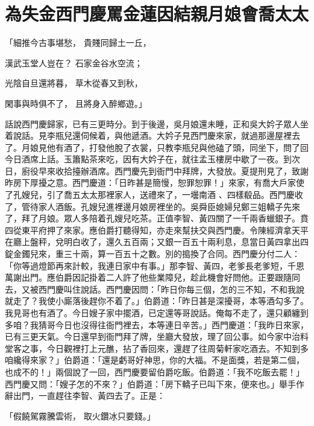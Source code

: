 %

\chapter{為失金西門慶罵金蓮\KG 因結親月娘會喬太太}

「細推今古事堪愁，  貴賤同歸土一丘，

漢武玉堂人豈在？  石家金谷水空流；

光陰自旦還將暮，  草木從春又到秋，

閑事與時俱不了，  且將身入醉鄉遊。」

話說西門慶歸家，已有三更時分。到于後邊，吳月娘還未睡，正和吳大妗子眾人坐着說話。見李瓶兒還伺候着，與他遞酒。大妗子見西門慶來家，就過那邊屋裡去了。月娘見他有酒了，打發他脫了衣裳，只教李瓶兒與他磕了頭，同坐下，問了回今日酒席上話。玉簫點茶來吃，因有大妗子在，就往孟玉樓房中歇了一夜。到次日，廚役早來收拾擡辦酒席。西門慶先到衙門中拜牌，大發放。夏提刑見了，致謝昨房下厚擾之意。西門慶道：「日昨甚是簡慢，恕罪恕罪！」來家，有喬大戶家使了孔嫂兒，引了喬五太太那裡家人，送禮來了，一壜南酒 、四樣殽品。西門慶收了，管待家人酒飯。孔嫂兒進裡邊月娘房裡坐的。吳舜臣媳婦兒鄭三姐轎子先來了，拜了月娘。眾人多陪着孔嫂兒吃茶。正值李智、黃四關了一千兩香蠟銀子。賁四從東平府押了來家。應伯爵打聽得知，亦走來幫扶交與西門慶。令陳經濟拿天平在廳上盤秤，兌明白收了，還久五百兩；又銀一百五十兩利息，息當日黃四拿出四錠金鐲兒來，重三十兩，算一百五十之數。別的搗換了合同。西門慶分付二人：「你等過燈節再來計較，我連日家中有事。」那李智、黃四，老爹長老爹短，千恩萬謝出門。應伯爵因記掛着二人許了他些業障兒，趁此機會好問他。正要跟隨同去，又被西門慶叫住說話。西門慶因問：「昨日你每三個，怎的三不知，不和我說就走了？我使小廝落後趕你不着了。」伯爵道：「昨日甚是深擾哥，本等酒勾多了。我見哥也有酒了。今日嫂子家中擺酒，已定還等哥說話。俺每不走了，還只顧纏到多咱？我猜哥今日也沒得往衙門裡去，本等連日辛苦。」西門慶道：「我昨日來家，已有三更天氣。今日還早到衙門拜了牌，坐廳大發放，理了回公事。如今家中治料堂客之事，今日觀裡打上元醮，拈了香回來，還趕了往周菊軒家吃酒去。不知到多咱纔得來家？」伯爵道：「還是虧哥好神思，你的大福。不是面獎，若是第二個，也成不的！」兩個說了一回，西門慶要留伯爵吃飯。伯爵道：「我不吃飯去罷！」西門慶又問：「嫂子怎的不來？」伯爵道：「房下轎子已叫下來，便來也。」舉手作辭出門，一直趕往李智、黃四去了。正是：

「假饒駕霧騰雲術，  取火鑽冰只要錢。」

